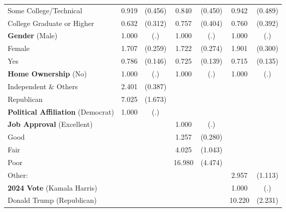 \begin{table}[htbp]
\begin{tabular}{l*{3}{cc}}
Some College/Technical&       0.919         &     (0.456)&       0.840         &     (0.450)&       0.942         &     (0.489)\\
College Graduate or Higher&       0.632         &     (0.312)&       0.757         &     (0.404)&       0.760         &     (0.392)\\
\textbf{Gender} (Male)&       1.000         &         (.)&       1.000         &         (.)&       1.000         &         (.)\\
Female              &       1.707\sym{***}&     (0.259)&       1.722\sym{***}&     (0.274)&       1.901\sym{***}&     (0.300)\\
Yes                 &       0.786         &     (0.146)&       0.725\sym{*}  &     (0.139)&       0.715\sym{*}  &     (0.135)\\
\textbf{Home Ownership} (No)&       1.000         &         (.)&       1.000         &         (.)&       1.000         &         (.)\\
Independent \& Others&       2.401\sym{***}&     (0.387)&                     &            &                     &            \\
Republican          &       7.025\sym{***}&     (1.673)&                     &            &                     &            \\
\textbf{Political Affiliation} (Democrat)&       1.000         &         (.)&                     &            &                     &            \\
\textbf{Job Approval} (Excellent)&                     &            &       1.000         &         (.)&                     &            \\
Good                &                     &            &       1.257         &     (0.280)&                     &            \\
Fair                &                     &            &       4.025\sym{***}&     (1.043)&                     &            \\
Poor                &                     &            &      16.980\sym{***}&     (4.474)&                     &            \\
Other:              &                     &            &                     &            &       2.957\sym{***}&     (1.113)\\
\textbf{2024 Vote} (Kamala Harris)&                     &            &                     &            &       1.000         &         (.)\\
Donald Trump (Republican)&                     &            &                     &            &      10.220\sym{***}&     (2.231)\\

\end{tabular}
\end{table}
